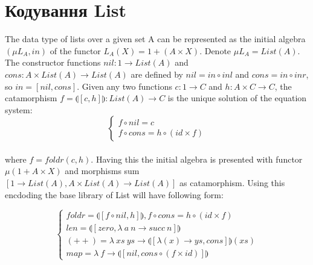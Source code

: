   \section{Кодування List}
  The data type of lists over a given set A can be represented as the initial algebra
  $(\mu L_A, in)$ of the functor $L_A(X) = 1 + (A \times X)$. Denote $\mu L_A = List(A)$.
  The constructor functions $nil: 1 \rightarrow List(A)$ and
  $cons: A \times List(A) \rightarrow List(A)$ are defined by
  $nil = in \circ inl$ and $cons = in \circ inr$, so $in = [nil,cons]$.
  Given any two functions $c: 1 \rightarrow C$ and $h: A \times C \rightarrow C$,
  the catamorphism $f = \llparenthesis [c,h] \rrparenthesis : List(A) \rightarrow C$
  is the unique solution of the equation system:
\vspace{0.3cm}
$$
\begin{cases}
  f \circ nil  = c \\
  f \circ cons = h \circ (id \times f)
\end{cases}
$$

\paragraph{}
  where $f = foldr(c,h)$. Having this the initial algebra is presented with functor
  $\mu (1 + A \times X)$ and morphisms sum $[1 \rightarrow List(A), A \times List(A) \rightarrow List(A)]$
  as catamorphism. Using this encdoding the base library of List will have following form:

\vspace{0.5cm}
$$
\begin{cases}
 foldr = \llparenthesis [ f \circ nil , h] \rrparenthesis, f \circ cons = h \circ (id \times f)\\
 len = \llparenthesis [ zero, \lambda\ a\ n \rightarrow succ\ n ] \rrparenthesis \\
 (++) = \lambda\ xs\ ys \rightarrow \llparenthesis [ \lambda (x) \rightarrow ys, cons ] \rrparenthesis (xs) \\
 map = \lambda\ f \rightarrow \llparenthesis [ nil, cons \circ (f \times id)] \rrparenthesis
\end{cases}
$$

